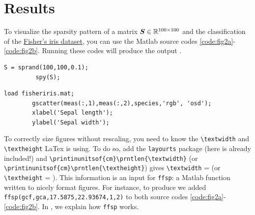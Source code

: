 
\section{Results \label{sec:results}}
	
	To visualize the sparsity pattern of a matrix \(\mat{S}\in\mathbb{R}^{100\times 100}\) and the classification of the \href{https://en.wikipedia.org/wiki/Iris_flower_data_set}{Fisher's iris dataset}, you can use the Matlab source codes \ref{code:fig2a}-\ref{code:fig2b}. Running these codes will produce the output .
	
	\begin{lstlisting}[style=Matlab-editor, caption={Matlab code for \reffig{fig:sparsity}}, label=code:fig2a]
		 S = sprand(100,100,0.1);
		 spy(S);
	\end{lstlisting}
		
	\begin{lstlisting}[style=Matlab-editor, caption={Matlab code for \reffig{fig:classification}}, label=code:fig2b]
		load fisheriris.mat; 
		gscatter(meas(:,1),meas(:,2),species,'rgb', 'osd');
		xlabel('Sepal length');
		ylabel('Sepal width');
	\end{lstlisting}
	
	To correctly size figures without rescaling, you need to know the \verb*|\textwidth| and  \verb*|\textheight| LaTex is using. 
	To do so, add the \verb*|layourts| package (here is already included!) and \verb*|\printinunitsof{cm}\prntlen{\textwidth}| (or \verb*|\printinunitsof{cm}\prntlen{\textheight}|) gives \verb*|\textwidth| = \prntlen{\textwidth} (or \verb*|\textheight| = \prntlen{\textheight}).
	This information is an input for \verb*|ffsp|: a Matlab function written to nicely format figures. 
	For instance, to produce  we added \verb*|ffsp(gcf,gca,17.5875,22.93674,1,2)| to both source codes \ref{code:fig2a}-\ref{code:fig2b}.
	In , we explain how \verb*|ffsp| works.
	

